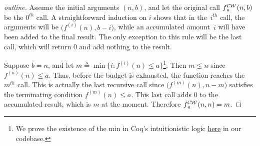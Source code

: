 \begin{proof}[outline]
	Assume the initial arguments $(n, b)$, and let the original call 
	\linebreak $\cdw{f}{a}(n, b)$ be the $0^{th}$ call. A straightforward induction on $i$ shows that in the~$i^{th}$ call, the arguments will be $\big(f^{(i)}(n), b-i\big)$, while an accumulated amount~$i$ will have been added to the final result. The only exception to this rule will be the last call, which 
	will return $0$ and add nothing to the result.
	
	Suppose $b = n$, and let $m \triangleq \min\big\{i : f^{(i)}(n)\le a\big\}$\footnote{We prove the existence
		of the min in Coq’s intuitionistic logic
	  \href{https://github.com/inv-ack/inv-ack/blob/7270e64a2600b771f2b1b1b151f7d13fb2ae6c97/countdown.v\#L129-L159}{here} in our codebase.}. Then $m \le n$ since $f^{(n)}(n)\le a$. Thus, before the budget is exhausted, the function reaches \linebreak the $m^{th}$ call. This is actually the last recursive call since $\big(f^{(m)}(n), n - m\big)$ satisfies the terminating condition $f^{(m)}(n)\le a$. This last call adds $0$ to the accumulated result, which is $m$ at the moment. Therefore $\cdw{f}{a}(n, n) = m$.
\end{proof}
